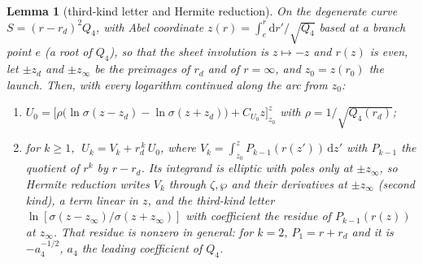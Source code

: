 \documentclass[12pt]{iopart}
\newcommand{\dd}{\mathrm{d}}
\theoremstyle{plain}
\theoremstyle{definition}
\theoremstyle{plain}
\newtheorem{auxlemma}{Lemma}
\theoremstyle{remark}
\begin{document}
\begin{auxlemma}[third-kind letter and Hermite reduction]\label{lem:U0}
On the degenerate curve $S=(r-r_d)^2Q_4$, with Abel coordinate
$z(r)=\int_{e}^r\dd r'/\sqrt{Q_4}$ based at a branch point $e$ (a root of $Q_4$), so that
the sheet involution is $z\mapsto-z$ and $r(z)$ is even, let $\pm z_d$ and $\pm z_\infty$
be the preimages of $r_d$ and of $r=\infty$, and $z_0=z(r_0)$ the launch. Then, with every
logarithm continued along the arc from $z_0$:
\begin{enumerate}
\item[(i)] $\displaystyle U_0=\Big[\rho\big(\ln\sigma(z-z_d)-\ln\sigma(z+z_d)\big)
+C_{U_0}z\Big]_{z_0}^{z}$ with $\rho=1/\sqrt{Q_4(r_d)}$;
\item[(ii)] for $k\ge1$, $\;U_k=V_k+r_d^{\,k}\,U_0$, where
$V_k=\int_{z_0}^{z}P_{k-1}(r(z'))\,\dd z'$ with $P_{k-1}$ the quotient of $r^k$ by $r-r_d$.
Its integrand is elliptic with poles only at $\pm z_\infty$, so Hermite reduction writes
$V_k$ through $\zeta,\wp$ and their derivatives at $\pm z_\infty$ (second kind), a term
linear in $z$, and the third-kind letter $\ln[\sigma(z-z_\infty)/\sigma(z+z_\infty)]$ with
coefficient the residue of $P_{k-1}(r(z))$ at $z_\infty$. That residue is nonzero in
general: for $k=2$, $P_1=r+r_d$ and it is $-a_4^{-1/2}$, $a_4$ the leading coefficient of
$Q_4$.
\end{enumerate}
\end{auxlemma}
\end{document}
